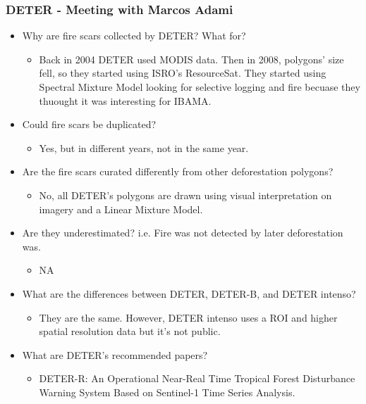 \documentclass{beamer}
\begin{document}
\begin{frame}[t, allowframebreaks]
    \frametitle{DETER - Meeting with Marcos Adami}
    \begin{itemize}
        \item Why are fire scars collected by DETER? What for?
        \begin{itemize}
            \item Back in 2004 DETER used MODIS data. Then in 2008, polygons' 
                size fell, so they started using ISRO's ResourceSat. They 
                started using Spectral Mixture Model looking for selective 
                logging and fire becuase they thuought it was interesting for
                IBAMA.
        \end{itemize}
        \item Could fire scars be duplicated? 
        \begin{itemize}
            \item Yes, but in different years, not in the same year.
        \end{itemize}
        \item Are the fire scars curated differently from other deforestation 
            polygons?
        \begin{itemize}
            \item No, all DETER's polygons are drawn using visual 
                interpretation on imagery and a Linear Mixture Model.
        \end{itemize}
        \item Are they underestimated? i.e. Fire was not detected by later 
            deforestation was.
        \begin{itemize}
            \item NA
        \end{itemize}
        \item What are the differences between DETER, DETER-B, and DETER 
            intenso?
        \begin{itemize}
            \item They are the same. However, DETER intenso uses a ROI and 
                higher spatial resolution data but it's not public.
        \end{itemize}
        \item What are DETER's recommended papers?
        \begin{itemize}
            \item DETER-R: An Operational Near-Real Time Tropical Forest 
                Disturbance Warning System Based on Sentinel-1 Time Series 
                Analysis.
        \end{itemize}
    \end{itemize}
\end{frame}
\end{document}
